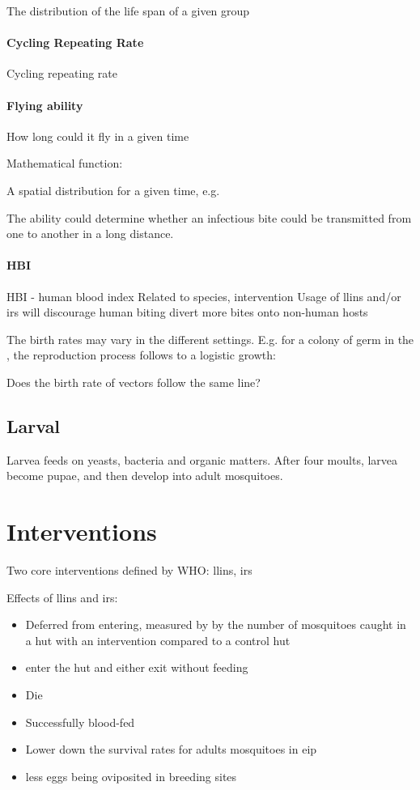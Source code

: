 \documentclass[a4paper, 12pt, twoside]{article}
\begin{document}
The distribution of the life span of a given group

\paragraph{Cycling Repeating Rate}
Cycling repeating rate

\paragraph{Flying ability}
How long could it fly in a given time

Mathematical function:

A spatial distribution for a given time, e.g.

The ability could determine whether an infectious bite could be transmitted from one to another in a long distance.

\paragraph{HBI}
HBI - human blood index
	Related to species, intervention
  Usage of \gls{llins} and/or \gls{irs} will discourage human biting divert more bites onto non-human hosts

	The birth rates may vary in the different settings. E.g. for a colony of germ in the , the reproduction process follows to a logistic growth:
	
	Does the birth rate of vectors follow the same line?

\subsection{Larval}

Larvea feeds on yeasts, bacteria and organic matters. After four moults, larvea become pupae, and then develop into adult mosquitoes.

\section{Interventions}

Two core interventions defined by WHO: \gls{llins}, \gls{irs}

Effects of \gls{llins} and \gls{irs}:

\begin{itemize}
\item Deferred from entering, measured by by the number of mosquitoes caught in a hut with an intervention compared to a control hut
\item enter the hut and either exit without feeding
\item Die
\item Successfully blood-fed
\item Lower down the survival rates for adults mosquitoes in \gls{eip} 
\item less eggs being oviposited in breeding sites
\end{itemize}
\end{document}
